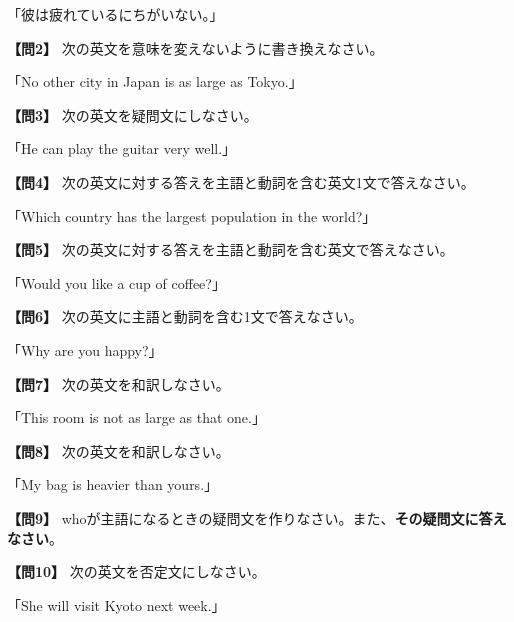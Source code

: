 \noindent「彼は疲れているにちがいない。」

\testqsep
\testquestion
\noindent\textbf{【問2】} 次の英文を意味を変えないように書き換えなさい。

\noindent「No other city in Japan is as large as Tokyo.」

\testqsep
\testquestion
\noindent\textbf{【問3】} 次の英文を疑問文にしなさい。

\noindent「He can play the guitar very well.」

\testqsep
\testquestion
\noindent\textbf{【問4】} 次の英文に対する答えを主語と動詞を含む英文1文で答えなさい。

\noindent「Which country has the largest population in the world?」

\testqsep
\testquestion
\noindent\textbf{【問5】} 次の英文に対する答えを主語と動詞を含む英文で答えなさい。

\noindent「Would you like a cup of coffee?」

\testqsep
\newpage
\testquestion
\noindent\textbf{【問6】} 次の英文に主語と動詞を含む1文で答えなさい。

\noindent「Why are you happy?」

\testqsep
\testquestion
\noindent\textbf{【問7】} 次の英文を和訳しなさい。

\noindent「This room is not as large as that one.」

\testqsep
\testquestion
\noindent\textbf{【問8】} 次の英文を和訳しなさい。

\noindent「My bag is heavier than yours.」

\testqsep
\testquestion
\noindent\textbf{【問9】} whoが主語になるときの疑問文を作りなさい。また、\textbf{その疑問文に答えなさい}。

\vspace{0.5em}
\testqsep
\testquestion
\noindent\textbf{【問10】} 次の英文を否定文にしなさい。

\noindent「She will visit Kyoto next week.」


